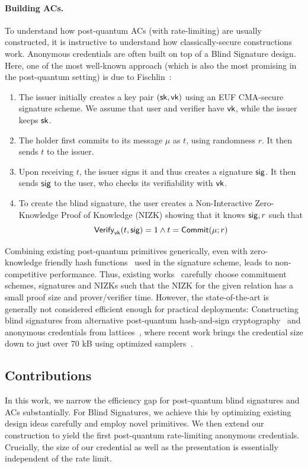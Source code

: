 \paragraph*{Building ACs.}
To understand how post-quantum ACs (with rate-limiting) are usually  constructed, it is instructive to understand how  classically-secure constructions work.
Anonymous credentials are often built on top of a Blind Signature design. Here, one of the most well-known approach (which is also the most promising in the post-quantum setting) is due to Fischlin~\cite{C:Fischlin06}:
\begin{enumerate}
	\item The issuer initially creates a key pair $(\mathsf{sk},\mathsf{vk})$ using an EUF CMA-secure signature scheme. We assume that user and verifier have $\mathsf{vk}$, while the issuer keeps $\mathsf{sk}$.
	\item The holder first commits to its message $\mu$ as \(t\), using randomness $r$. It then sends $t$ to the issuer.
	\item Upon receiving $t$, the issuer signs it and thus  creates a signature $\mathsf{sig}$. It then sends $\mathsf{sig}$ to the user, who checks its verifiability with $\mathsf{vk}$.
	\item To create the blind signature, the user creates a Non-Interactive Zero-Knowledge Proof of Knowledge (NIZK) showing that it knows $\mathsf{sig},r$ such that $$\mathsf{Verify}_{\mathsf{vk}}(t,\mathsf{sig})=1 \land t= \mathsf{Commit}(\mu;r)$$
\end{enumerate}
Combining existing post-quantum primitives generically, even with zero-knowledge friendly hash
functions~\cite{EPRINT:PWFW23} used in the signature scheme, leads to non-competitive performance. Thus, existing
works~\cite{C:BLNS23,CCS:AGJLRS24,EPRINT:FenRiv25a} carefully choose commitment schemes, signatures and NIZKs such
that the NIZK for the given relation has a small
proof size and prover/verifier time. However, the state-of-the-art is generally not considered efficient enough for
practical deployments: Constructing blind signatures from alternative post-quantum hash-and-sign
cryptography~\cite{EPRINT:BFMRSV25a} and anonymous credentials from lattices~\cite{EPRINT:LCLLW23}, where recent work
brings the credential size down to just over 70 kB using optimized samplers~\cite{C:JeuRouSan23,AC:JeuSan25}.

\subsection{Contributions}
In this work, we narrow the efficiency gap for post-quantum blind signatures and ACs substantially. For Blind Signatures, we achieve this by optimizing existing design ideas carefully and employ novel primitives. We then extend our construction to yield the first post-quantum rate-limiting anonymous credentials. Crucially, the size of our credential as well as the presentation is essentially independent of the rate limit.

